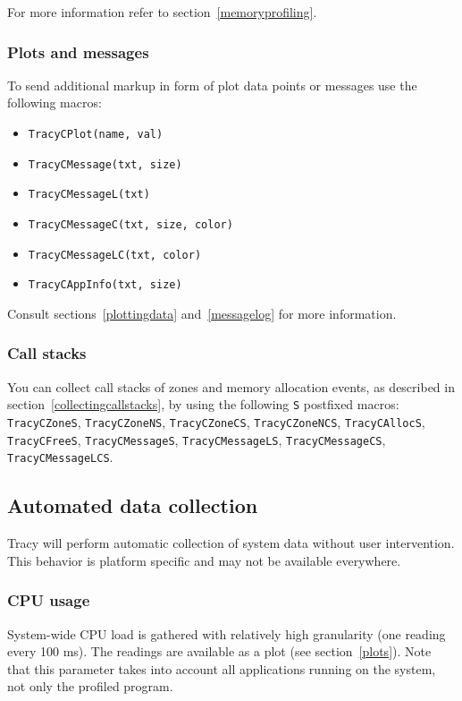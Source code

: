\documentclass[hidelinks,titlepage,a4paper]{article}
\begin{document}
For more information refer to section~\ref{memoryprofiling}.

\subsubsection{Plots and messages}

To send additional markup in form of plot data points or messages use the following macros:

\begin{itemize}
\item \texttt{TracyCPlot(name, val)}
\item \texttt{TracyCMessage(txt, size)}
\item \texttt{TracyCMessageL(txt)}
\item \texttt{TracyCMessageC(txt, size, color)}
\item \texttt{TracyCMessageLC(txt, color)}
\item \texttt{TracyCAppInfo(txt, size)}
\end{itemize}

Consult sections~\ref{plottingdata} and~\ref{messagelog} for more information.

\subsubsection{Call stacks}

You can collect call stacks of zones and memory allocation events, as described in section~\ref{collectingcallstacks}, by using the following \texttt{S} postfixed macros: \texttt{TracyCZoneS}, \texttt{TracyCZoneNS}, \texttt{TracyCZoneCS}, \texttt{TracyCZoneNCS}, \texttt{TracyCAllocS}, \texttt{TracyCFreeS}, \texttt{TracyCMessageS}, \texttt{TracyCMessageLS}, \texttt{TracyCMessageCS}, \texttt{TracyCMessageLCS}.

\subsection{Automated data collection}
\label{automated}

Tracy will perform automatic collection of system data without user intervention. This behavior is platform specific and may not be available everywhere.

\subsubsection{CPU usage}

System-wide CPU load is gathered with relatively high granularity (one reading every 100 \si{\milli\second}). The readings are available as a plot (see section~\ref{plots}). Note that this parameter takes into account all applications running on the system, not only the profiled program.
\end{document}
